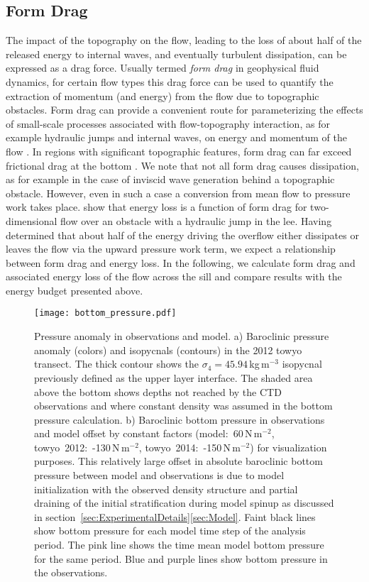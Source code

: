 \documentclass{ametsocV6.1}
\begin{document}
\subsection{Form Drag}
\label{ssec:FormDrag}
The impact of the topography on the flow, leading to the loss of about half of the released energy to internal waves, and eventually turbulent dissipation, can be expressed as a drag force.
Usually termed \emph{form drag} in geophysical fluid dynamics, for certain flow types this drag force can be used to quantify the extraction of momentum (and energy) from the flow due to topographic obstacles.
Form drag can provide a convenient route for parameterizing the effects of small-scale processes associated with flow-topography interaction, as for example hydraulic jumps and internal waves, on energy and momentum of the flow \citep[e.g.][]{klymaketal10a, maccreadyetal03, warneretal13}.
In regions with significant topographic features, form drag can far exceed frictional drag at the bottom \citep[e.g.][]{moumnash00, edwardsetal04, mccabeetal06, warneretal13}.
We note that not all form drag causes dissipation, as for example in the case of inviscid wave generation behind a topographic obstacle.
However, even in such a case a conversion from mean flow to pressure work takes place.
\citet[][p.~72]{prattwhitehead07} show that energy loss is a function of form drag for two-dimensional flow over an obstacle with a hydraulic jump in the lee.
Having determined that about half of the energy driving the overflow either dissipates or leaves the flow via the upward pressure work term, we expect a relationship between form drag and energy loss. 
In the following, we calculate form drag and associated energy loss of the flow across the sill and compare results with the energy budget presented above.

\begin{figure*}
\centerline{\texttt{[image: bottom\_pressure.pdf]}}
\caption{Pressure anomaly in observations and model.
a) Baroclinic pressure anomaly (colors) and isopycnals (contours) in the 2012 towyo transect.
The thick contour shows the $\sigma_4=45.94$\,kg\,m$^{-3}$ isopycnal previously defined as the upper layer interface.
The shaded area above the bottom shows depths not reached by the CTD observations and where constant density was assumed in the bottom pressure calculation.
b) Baroclinic bottom pressure in observations and model offset by constant factors (model:~60\,N\,m$^{-2}$, towyo~2012:~-130\,N\,m$^{-2}$, towyo~2014:~-150\,N\,m$^{-2}$) for visualization purposes.
This relatively large offset in absolute baroclinic bottom pressure between model and observations is due to model initialization with the observed density structure and partial draining of the initial stratification during model spinup as discussed in section~\ref{sec:ExperimentalDetails}\ref{sec:Model}.
Faint black lines show bottom pressure for each model time step of the analysis period.
The pink line shows the time mean model bottom pressure for the same period.
Blue and purple lines show bottom pressure in the observations. 
}
\label{fig:BottomPressure}
\end{figure*}
\end{document}
